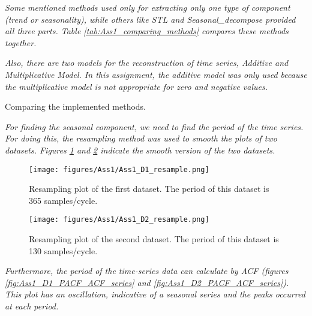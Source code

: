 \textit{\newline \newline Some mentioned methods used only for extracting only one type of component (trend or seasonality), while others like STL 
and Seasonal\_decompose provided all three parts. Table \ref{tab:Ass1_comparing_methods} compares these methods together.}

\textit{Also, there are two models for the reconstruction of time series, Additive and Multiplicative Model. In this assignment, the additive model was only used because the multiplicative model is not appropriate for zero and negative values.}

\begin{table}[H]
\centering
\caption{Comparing the implemented methods.}
\label{tab:Ass1_comparing_methods}

\end{table}


\textit{For finding the seasonal component, we need to find the period of the time series. For doing this, the resampling method was used to smooth the plots of two datasets. Figures \ref{fig:Ass1_D1_resample} and \ref{fig:Ass1_D2_resample} indicate the smooth version of the two datasets. }

\begin{figure}[H]
    \centering
    \begin{minipage}[b]{1\textwidth}
        \texttt{[image: figures/Ass1/Ass1\_D1\_resample.png]}
    \end{minipage}
    \caption{Resampling plot of the first dataset. The period of this dataset is 365 samples/cycle. }
    \label{fig:Ass1_D1_resample}
\end{figure}

\begin{figure}[H]
    \centering
    \begin{minipage}[b]{1\textwidth}
        \texttt{[image: figures/Ass1/Ass1\_D2\_resample.png]}
    \end{minipage}
    \caption{Resampling plot of the second dataset. The period of this dataset is 130 samples/cycle.}
    \label{fig:Ass1_D2_resample}
\end{figure}


\textit{Furthermore, the period of the time-series data can calculate by \gls{ACF} (figures \ref{fig:Ass1_D1_PACF_ACF_series} and \ref{fig:Ass1_D2_PACF_ACF_series}). This plot has an oscillation, indicative of a seasonal series and the peaks occurred at each period. }

